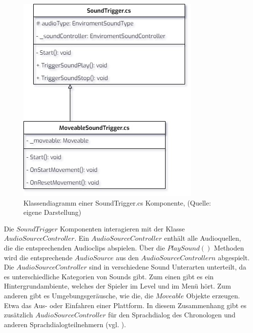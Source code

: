 \begin{figure}[ht]
\centering
\includegraphics[width=0.5\linewidth]{content/pictures/SoundTrigger.jpg}
\caption{Klassendiagramm einer SoundTrigger.cs Komponente, (Quelle: eigene Darstellung)}
\label{fig:sound-trigger}
\end{figure}

Die $SoundTrigger$ Komponenten interagieren mit der Klasse $AudioSourceController$. Ein $AudioSourceController$ enthält alle Audioquellen, die die entsprechenden Audioclips abspielen. Über die $PlaySound()$ Methoden wird die entsprechende $AudioSource$ aus den $AudioSourceControllern$ abgespielt. Die $AudioSourceController$ sind in verschiedene Sound Unterarten unterteilt, da es unterschiedliche Kategorien von Sounds gibt. Zum einen gibt es ein Hintergrundambiente, welches der Spieler im Level und im Menü hört. Zum anderen gibt es Umgebungsgeräusche, wie die, die $Moveable$ Objekte erzeugen. Etwa das Aus- oder Einfahren einer Plattform. 
In diesem Zusammenhang gibt es zusätzlich $AudioSourceController$ für den Sprachdialog des Chronologen und anderen Sprachdialogteilnehmern (vgl. ). 


